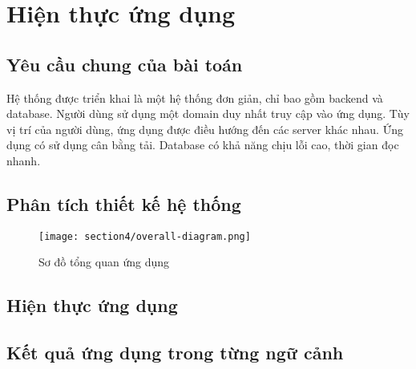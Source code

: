 \section{Hiện thực ứng dụng}
\label{results}

\subsection{Yêu cầu chung của bài toán}

Hệ thống được triển khai là một hệ thống đơn giản, chỉ bao gồm backend và database. Người dùng sử dụng một domain duy nhất truy cập vào ứng dụng. Tùy vị trí của người dùng, ứng dụng được điều hướng đến các server khác nhau. Ứng dụng có sử dụng cân bằng tải. Database có khả năng chịu lỗi cao, thời gian đọc nhanh.

\subsection{Phân tích thiết kế hệ thống}

\begin{figure}
    \centering
    \texttt{[image: section4/overall-diagram.png]}
    \caption{Sơ đồ tổng quan ứng dụng}
    \label{fig:sec4-overall-diagram}
\end{figure}

\subsection{Hiện thực ứng dụng}

\subsection{Kết quả ứng dụng trong từng ngữ cảnh}